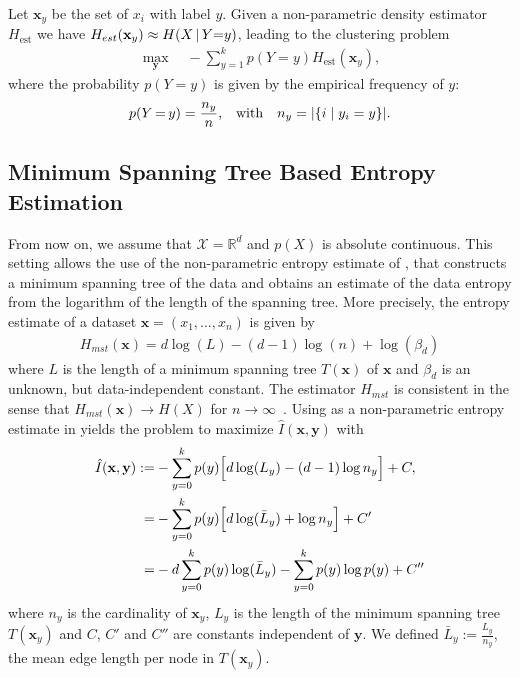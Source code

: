 Let $\mathbf{x}_y$ be the set of $x_i$ with label $y$. 
Given a non-parametric density estimator $H_\text{est}$
we have $H_{est}(\mathbf{x}_y) \approx H(X \, | \, Y {=} y)$, leading to the clustering problem
\begin{align}\label{eq:general_objective}
     \max_{\mathbf{y}}\quad - \sum_{y=1}^k p(Y{=}y) H_\text{est}(\mathbf{x}_y),
\end{align}
where the probability $p(Y{=}y)$ is given by the empirical frequency of $y$: 
\[
    p(Y\,{=}\,y)= \frac{n_y}{n} \text{,\quad with\quad} n_y = |\{i \mid y_i = y \}|.
\]

\subsection{Minimum Spanning Tree Based Entropy Estimation}
From now on, we assume that $\mathcal{X}=\mathbb{R}^d$ and $p(X)$ is
absolute continuous.
This setting allows the use of the non-parametric entropy estimate of
\citet{hero1999asymptotic}, that constructs a minimum spanning tree of the data
and obtains an estimate of the data entropy from the logarithm of the length of
the spanning tree.
%
More precisely, the entropy estimate of a dataset $\mathbf{x} = (x_1, \dotsc, x_n)$ is given by
\begin{align}\label{eq:hmst}
    H_{mst}(\mathbf{x}) = d \log(L) - (d-1) \log(n) + \log(\beta_d)
\end{align}
where $L$ is the length of a minimum spanning tree $T(\mathbf{x})$ of $\mathbf{x}$ and $\beta_d$ is an
unknown, but data-independent constant.
The estimator $H_{mst}$ is consistent in the sense that $H_{mst}(\mathbf{x}) \rightarrow H(X)$
for $n \rightarrow \infty$~\citep{hero1999asymptotic}.
Using  as a non-parametric entropy estimate in  yields
the problem to maximize $\hat{I}(\mathbf{x}, \mathbf{y})$ with
\begin{align}\label{eq:objective}
     \hat{I}(\mathbf{x}, \mathbf{y}) := & -\sum_{y=0}^k p(y) \Bigl[ d \log(L_y) - (d-1) \log{n_y} \Bigr] + C,\\
    = & - \sum_{y=0}^k p(y) \Bigl[ d \log(\bar{L}_y  ) + \log{n_y} \Bigr] + C'\\
    = & - d \sum_{y=0}^k p(y) \log(\bar{L}_y  ) - \sum_{y=0}^k p(y) \log{p(y) + C''} \label{eq:objective_simplified}
\end{align}
where $n_y$ is the cardinality of $\mathbf{x}_y$, $L_y$ is the length of the
minimum spanning tree $T(\mathbf{x}_y)$ and $C$, $C'$ and $C''$ are constants independent of
$\mathbf{y}$.  We defined $\bar{L}_y := \frac{L_y}{n_y}$, the mean edge length
per node in $T(\mathbf{x}_y)$.

